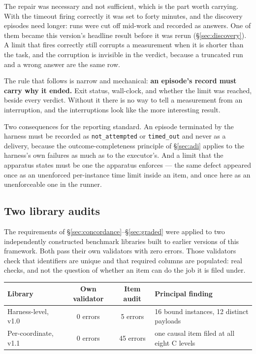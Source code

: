 \documentclass[11pt]{article}
\theoremstyle{definition}
\begin{document}
The repair was necessary and not sufficient, which is the part worth carrying. With the timeout firing correctly it was set to forty minutes, and the discovery episodes need longer: runs were cut off mid-work and recorded as answers. One of them became this version's headline result before it was rerun (\S\ref{sec:discovery}). A limit that fires correctly still corrupts a measurement when it is shorter than the task, and the corruption is invisible in the verdict, because a truncated run and a wrong answer are the same row.

The rule that follows is narrow and mechanical: \textbf{an episode's record must carry why it ended.} Exit status, wall-clock, and whether the limit was reached, beside every verdict. Without it there is no way to tell a measurement from an interruption, and the interruptions look like the more interesting result.

Two consequences for the reporting standard. An episode terminated by the harness must be recorded as \texttt{not\_attempted} or \texttt{timed\_out} and never as a delivery, because the outcome-completeness principle of \S\ref{sec:adi} applies to the harness's own failures as much as to the executor's. And a limit that the apparatus states must be one the apparatus enforces --- the same defect appeared once as an unenforced per-instance time limit inside an item, and once here as an unenforceable one in the runner.

\subsection{Two library audits}\label{sec:libraries}

The requirements of \S\ref{sec:concordance}--\S\ref{sec:graded} were applied to two independently constructed benchmark libraries built to earlier versions of this framework. Both pass their own validators with zero errors. Those validators check that identifiers are unique and that required columns are populated: real checks, and not the question of whether an item can do the job it is filed under.

\begin{table}[h]
\centering\small
\begin{tabularx}{\textwidth}{@{}lccY@{}}
\toprule
Library & Own validator & Item audit & Principal finding \\
\midrule
Harness-level, v1.0 & 0 errors & 5 errors & 16 bound instances, 12 distinct payloads \\
Per-coordinate, v1.1 & 0 errors & 45 errors & one causal item filed at all eight C levels \\
\bottomrule
\end{tabularx}
\end{table}
\end{document}
